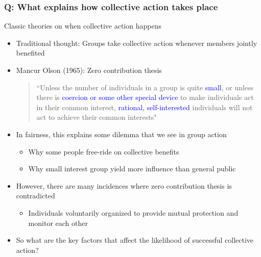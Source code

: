 \documentclass[aspectratio=169]{beamer}
\begin{document}
\begin{frame}
\frametitle{Q: What explains how collective action takes place}
Classic theories on when collective action happens 
\begin{itemize}\setlength\itemsep{3pt}
  \item Traditional thought: Groups take collective action whenever members jointly benefited
\item Mancur Olson (1965): Zero contribution thesis
\begin{quote}
  ``Unless the number of individuals in a group is quite \textcolor{blue}{small}, or unless there is \textcolor{blue}{coercion or some other special device} to make individuals act in their common interest, \textcolor{blue}{rational, self-interested} individuals will not act to achieve their common interests"
\end{quote}
\item In fairness, this explains some dilemma that we see in group action
\begin{itemize}\setlength\itemsep{3pt}
\item Why some people free-ride on collective benefits
\item Why small interest group yield more influence than general public
\end{itemize}
\item However, there are many incidences where zero contribution thesis is contradicted
\begin{itemize}
\item Individuals voluntarily organized to provide mutual protection and monitor each other
\end{itemize}
\item So what are the key factors that affect the likelihood of successful collective action?
\end{itemize}
\end{frame}
\end{document}
